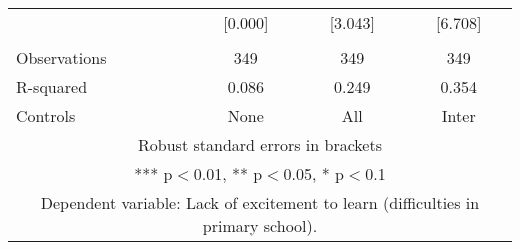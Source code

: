 \begin{tabular}{lccc}
 & [0.000] & [3.043] & [6.708] \\
 &  &  &  \\
Observations & 349 & 349 & 349 \\
R-squared & 0.086 & 0.249 & 0.354 \\
 Controls & None & All & Inter \\ \hline
\multicolumn{4}{c}{ Robust standard errors in brackets} \\
\multicolumn{4}{c}{ *** p$<$0.01, ** p$<$0.05, * p$<$0.1} \\
\multicolumn{4}{c}{ Dependent variable: Lack of excitement to learn (difficulties in primary school).} \\
\end{tabular}
